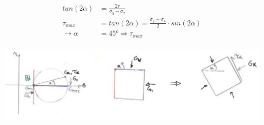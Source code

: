 \begin{minipage}{0.45\linewidth}
	\bigskip
	\begin{align*}
		tan(2 \alpha)	&= \frac{2 \tau}{\sigma_y - \sigma_x} \\
		\tau_{max}		&= tan(2 \alpha) = \frac{\sigma_y - \sigma_x}{2} \cdot sin(2 \alpha) \\
		\rightarrow \alpha &= 45° \Rightarrow \tau_{max} \\ 
	\end{align*}
\end{minipage}
\begin{minipage}{0.5\linewidth}
	\includegraphics[width=\linewidth]{images/Mohrsch3BspPol.PNG}
\end{minipage}